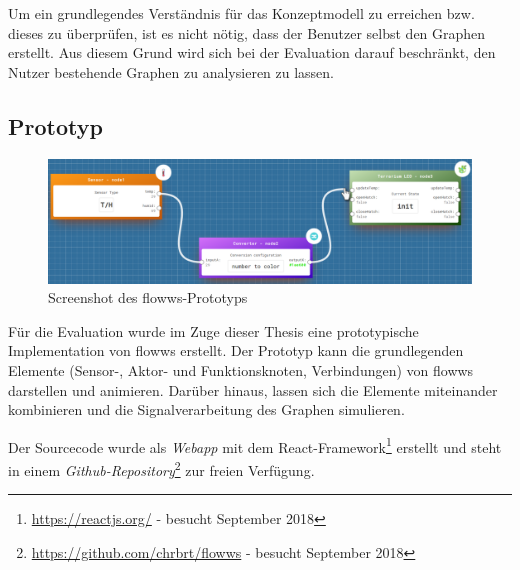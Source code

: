 Um ein grundlegendes Verständnis für das Konzeptmodell zu erreichen bzw. dieses zu überprüfen, ist es nicht nötig, dass der Benutzer selbst den Graphen erstellt. Aus diesem Grund wird sich bei der Evaluation darauf beschränkt, den Nutzer bestehende Graphen zu analysieren zu lassen.

\subsection{Prototyp}

\begin{figure}[h]
  \centering
  \includegraphics[width=1\textwidth]{bilder/chapter5/screenshotflows.pdf}
  \caption{Screenshot des flowws-Prototyps}
  \label{fig:genericnode}
\end{figure}

Für die Evaluation wurde im Zuge dieser Thesis eine prototypische Implementation von flowws erstellt. Der Prototyp kann die grundlegenden Elemente (Sensor-, Aktor- und Funktionsknoten, Verbindungen) von flowws darstellen und animieren. Darüber hinaus, lassen sich die Elemente miteinander kombinieren und die Signalverarbeitung des Graphen simulieren.

Der Sourcecode wurde als \textit{Webapp} mit dem React-Framework\footnote{\url{https://reactjs.org/} - besucht September 2018} erstellt und steht in einem \textit{Github-Repository}\footnote{\url{https://github.com/chrbrt/flowws} - besucht September 2018} zur freien Verfügung.